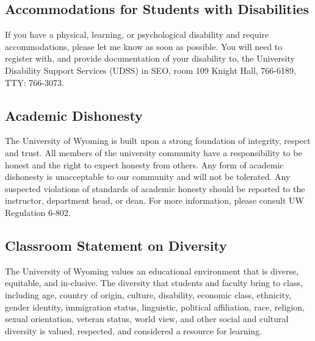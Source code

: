 \documentclass[11pt, letterpaper]{article}
\begin{document}
\subsection*{Accommodations for Students with Disabilities} If you have a physical, learning, or psychological disability and require accommodations, please let me know as soon as possible. You will need to register with, and provide documentation of your disability to, the University Disability Support Services (UDSS) in SEO, room 109 Knight Hall, 766-6189, TTY: 766-3073.

\subsection*{Academic Dishonesty} The University of Wyoming is built upon a strong foundation of integrity, respect and trust. All members of the university community have a responsibility to be honest and the right to expect honesty from others. Any form of academic dishonesty is unacceptable to our community and will not be tolerated. Any suspected violations of standards of academic honesty should be reported to the instructor, department head, or dean. For more information, please consult UW Regulation 6-802.

\subsection*{Classroom Statement on Diversity} The University of Wyoming values an educational environment that is diverse, equitable, and in-clusive. The diversity that students and faculty bring to class, including age, country of origin, culture, disability, economic class, ethnicity, gender identity, immigration status, linguistic, political affiliation, race, religion, sexual orientation, veteran status, world view, and other social and cultural diversity is valued, respected, and considered a resource for learning.
\end{document}
